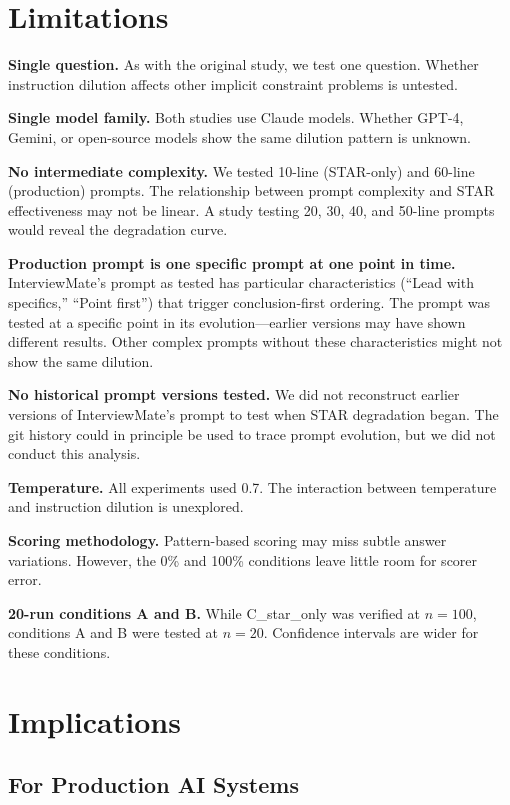 \documentclass[11pt]{article}
\begin{document}
\section{Limitations}

\textbf{Single question.} As with the original study, we test one question. Whether instruction dilution affects other implicit constraint problems is untested.

\textbf{Single model family.} Both studies use Claude models. Whether GPT-4, Gemini, or open-source models show the same dilution pattern is unknown.

\textbf{No intermediate complexity.} We tested 10-line (STAR-only) and 60-line (production) prompts. The relationship between prompt complexity and STAR effectiveness may not be linear. A study testing 20, 30, 40, and 50-line prompts would reveal the degradation curve.

\textbf{Production prompt is one specific prompt at one point in time.} InterviewMate's prompt as tested has particular characteristics (``Lead with specifics,'' ``Point first'') that trigger conclusion-first ordering. The prompt was tested at a specific point in its evolution---earlier versions may have shown different results. Other complex prompts without these characteristics might not show the same dilution.

\textbf{No historical prompt versions tested.} We did not reconstruct earlier versions of InterviewMate's prompt to test when STAR degradation began. The git history could in principle be used to trace prompt evolution, but we did not conduct this analysis.

\textbf{Temperature.} All experiments used 0.7. The interaction between temperature and instruction dilution is unexplored.

\textbf{Scoring methodology.} Pattern-based scoring may miss subtle answer variations. However, the 0\% and 100\% conditions leave little room for scorer error.

\textbf{20-run conditions A and B.} While C\_star\_only was verified at $n=100$, conditions A and B were tested at $n=20$. Confidence intervals are wider for these conditions.

\section{Implications}

\subsection{For Production AI Systems}
\end{document}
